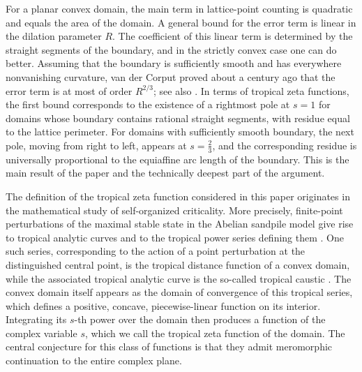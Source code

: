 \documentclass[a4paper,american,11pt]{amsart}
\theoremstyle{plain}
\theoremstyle{definition}
\begin{document}
For a planar convex domain, the main term in lattice-point counting is
quadratic and equals the area of the domain. A general bound for the error
term is linear in the dilation parameter \(R\). The coefficient of this linear
term is determined by the straight segments of the boundary, and in the
strictly convex case one can do better. Assuming that the boundary is
sufficiently smooth and has everywhere nonvanishing curvature, van der Corput
proved \cite{vanDerCorput1920} about a century ago that the error term is at
most of order \(R^{2/3}\); see also
\cite{IvicKratzelKuehleitnerNowak2004,Huxley2000}. In terms of tropical zeta
functions, the first bound corresponds to the existence of a rightmost pole at
\(s=1\) for domains whose boundary contains rational straight segments, with
residue equal to the lattice perimeter. For domains with sufficiently smooth
boundary, the next pole, moving from right to left, appears at
\(s=\frac23\), and the corresponding residue is universally proportional to
the equiaffine arc length of the boundary. This is the main result of the paper
and the technically deepest part of the argument.

The definition of the tropical zeta function considered in this paper
originates in the mathematical study of self-organized criticality. More
precisely, finite-point perturbations of the maximal stable state in the
Abelian sandpile model give rise to tropical analytic curves and to the
tropical power series defining them
\cite{KalininShkolnikov2015TropicalCurvesSandpileModels,
KalininShkolnikov2020SandpileSolitons,
KalininShkolnikov2018IntroductionTropicalSeries,
KalininShkolnikov2016TropicalCurvesSandpiles}. One such series,
corresponding to the action of a point perturbation at the distinguished
central point, is the tropical distance function of a convex domain, while the
associated tropical analytic curve is the so-called tropical caustic
\cite{MikhalkinShkolnikov2023WaveFrontsCaustics,
Shkolnikov2025PlanarTropicalCaustics}. The convex domain itself appears as
the domain of convergence of this tropical series, which defines a positive,
concave, piecewise-linear function on its interior. Integrating its \(s\)-th
power over the domain then produces a function of the complex variable \(s\),
which we call the tropical zeta function of the domain. The central conjecture
for this class of functions is that they admit meromorphic continuation to the
entire complex plane.
\end{document}
